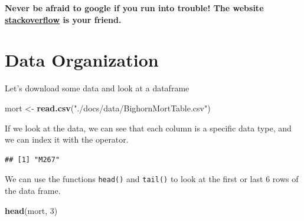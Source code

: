 \documentclass[
]{book}
\newenvironment{Shaded}{\begin{snugshade}}{\end{snugshade}}
\newcommand{\DecValTok}[1]{\textcolor[rgb]{0.00,0.00,0.81}{#1}}
\newcommand{\FunctionTok}[1]{\textcolor[rgb]{0.13,0.29,0.53}{\textbf{#1}}}
\newcommand{\NormalTok}[1]{#1}
\newcommand{\OtherTok}[1]{\textcolor[rgb]{0.56,0.35,0.01}{#1}}
\newcommand{\SpecialCharTok}[1]{\textcolor[rgb]{0.81,0.36,0.00}{\textbf{#1}}}
\newcommand{\StringTok}[1]{\textcolor[rgb]{0.31,0.60,0.02}{#1}}
\begin{document}
\textbf{Never be afraid to google if you run into trouble! The website \href{https://stackoverflow.com}{stackoverflow} is your friend.}

\chapter{Data Organization}\label{data-organization}

Let's download some data and look at a dataframe

\begin{Shaded}
\begin{Highlighting}[]
\NormalTok{mort }\OtherTok{\textless{}{-}} \FunctionTok{read.csv}\NormalTok{(}\StringTok{"./docs/data/BighornMortTable.csv"}\NormalTok{)}
\end{Highlighting}
\end{Shaded}

If we look at the data, we can see that each column is a specific data type,
and we can index it with the operator.

\begin{Shaded}
\end{Shaded}

\begin{verbatim}
## [1] "M267"
\end{verbatim}

We can use the functions \texttt{head()} and \texttt{tail()} to look at the first or last 6 rows of the data frame.

\begin{Shaded}
\begin{Highlighting}[]
\FunctionTok{head}\NormalTok{(mort, }\DecValTok{3}\NormalTok{) }
\end{Highlighting}
\end{Shaded}
\end{document}
